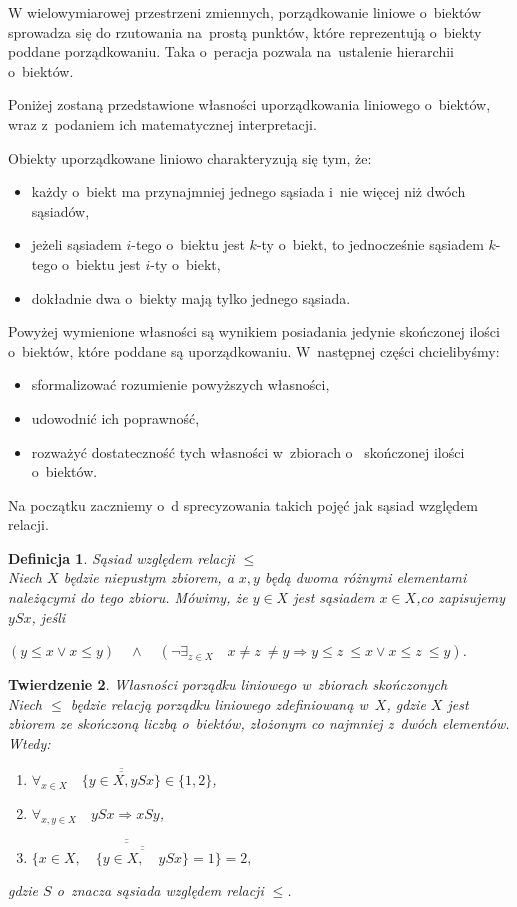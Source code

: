 \documentclass[12pt,a4paper]{report}
\newtheorem{theorem}{Twierdzenie}[section]
\newtheorem{definition}[theorem]{Definicja}
\newcommand{\licznosc}[1]{\overline{\overline{#1}}}
\begin{document}
W wielowymiarowej przestrzeni zmiennych, porządkowanie liniowe o~biektów sprowadza się do rzutowania na~prostą punktów, które reprezentują o~biekty poddane porządkowaniu.  Taka o~peracja pozwala na~ustalenie hierarchii o~biektów.

Poniżej zostaną przedstawione własności uporządkowania liniowego o~biektów, wraz z~podaniem ich matematycznej interpretacji.

Obiekty uporządkowane liniowo charakteryzują się tym, że:
\begin{itemize}
\item każdy o~biekt ma przynajmniej jednego sąsiada i~nie więcej niż dwóch sąsiadów,
\item jeżeli sąsiadem $i$-tego o~biektu jest $k$-ty o~biekt, to jednocześnie sąsiadem $k$-tego o~biektu jest $i$-ty o~biekt,
\item dokładnie dwa o~biekty mają tylko jednego sąsiada.
\end{itemize}


Powyżej wymienione własności są wynikiem posiadania jedynie skończonej ilości o~biektów, które poddane są uporządkowaniu. W~następnej części chcielibyśmy:
\begin{itemize}
\item sformalizować rozumienie powyższych własności,
\item udowodnić ich poprawność,
\item rozważyć dostateczność tych własności w~zbiorach o~ skończonej ilości o~biektów.
\end{itemize}


Na początku zaczniemy o~d sprecyzowania takich pojęć jak sąsiad względem relacji.

\begin{definition}{Sąsiad względem relacji $\leq$}\label{def-sasiada} \\
Niech  $X$ będzie niepustym zbiorem, a $x, y$ będą dwoma różnymi elementami należącymi do tego zbioru. Mówimy, że $y \in X$ jest sąsiadem $x \in X$,co zapisujemy $ySx$, jeśli

$\left(y \leq x \lor x \leq y \right) \quad \land \quad  \left(\lnot \exists_{z \in X}  \quad x\neq z~\neq y \Rightarrow   y \leq z~\leq x \lor x \leq z~\leq y \right)$.
\end{definition}


\begin{theorem}{Własności porządku liniowego w~zbiorach skończonych}\\
Niech $\leq$ będzie relacją porządku liniowego zdefiniowaną w~$X$, gdzie $X$ jest zbiorem ze skończoną liczbą o~biektów, złożonym co najmniej z~dwóch elementów. Wtedy:
\begin{enumerate}
\item $\forall_{x \in X} \quad \licznosc{\{y \in X, ySx\}} \in \{1,2\}$,
\item $\forall_{x, y \in X} \quad ySx \Rightarrow xSy $,
\item $\licznosc{\{x \in X, \quad \licznosc{\{y \in X, \quad ySx \}}=1\}}=2,$
\end{enumerate}
gdzie $S$ o~znacza sąsiada względem relacji $\leq$.
\end{theorem}
\end{document}
